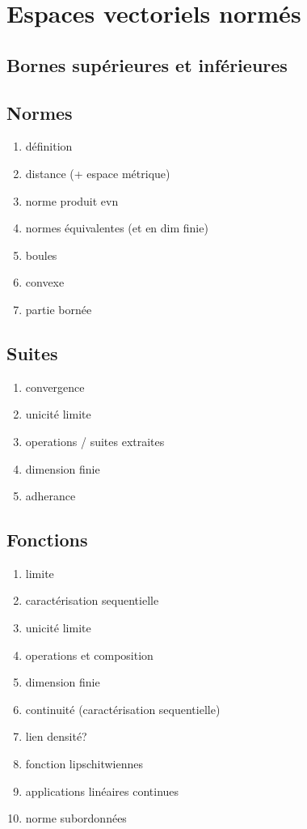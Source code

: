 \section{Espaces vectoriels normés}

\subsection{Bornes supérieures et inférieures}
\subsection{Normes}
\begin{enumerate}
    \item définition
    \item distance (+ espace métrique)
    \item norme produit evn
    \item normes équivalentes (et en dim finie)
    \item boules
    \item convexe
    \item partie bornée
\end{enumerate}

\subsection{Suites}

\begin{enumerate}
    \item convergence
    \item unicité limite
    \item operations / suites extraites
    \item dimension finie
    \item adherance
\end{enumerate}

\subsection{Fonctions}

\begin{enumerate}
    \item limite
    \item caractérisation sequentielle
    \item unicité limite
    \item operations et composition
    \item dimension finie
    \item continuité (caractérisation sequentielle)
    \item lien densité?
    \item fonction lipschitwiennes
    \item applications linéaires continues
    \item norme subordonnées
\end{enumerate}